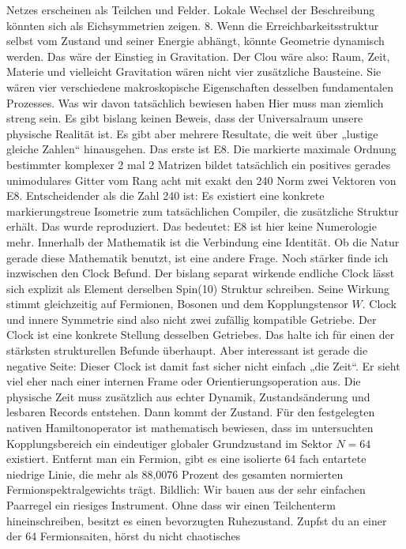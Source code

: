 Netzes erscheinen als Teilchen und Felder. Lokale Wechsel der
Beschreibung könnten sich als Eichsymmetrien zeigen. 8. Wenn die
Erreichbarkeitsstruktur selbst vom Zustand und seiner Energie abhängt,
könnte Geometrie dynamisch werden. Das wäre der Einstieg in Gravitation.
Der Clou wäre also: Raum, Zeit, Materie und vielleicht Gravitation wären
nicht vier zusätzliche Bausteine. Sie wären vier verschiedene
makroskopische Eigenschaften desselben fundamentalen Prozesses. Was wir
davon tatsächlich bewiesen haben Hier muss man ziemlich streng sein. Es
gibt bislang keinen Beweis, dass der Universalraum unsere physische
Realität ist. Es gibt aber mehrere Resultate, die weit über „lustige
gleiche Zahlen`` hinausgehen. Das erste ist E8. Die markierte maximale
Ordnung bestimmter komplexer 2 mal 2 Matrizen bildet tatsächlich ein
positives gerades unimodulares Gitter vom Rang acht mit exakt den 240
Norm zwei Vektoren von E8. Entscheidender als die Zahl 240 ist: Es
existiert eine konkrete markierungstreue Isometrie zum tatsächlichen
Compiler, die zusätzliche Struktur erhält. Das wurde reproduziert. Das
bedeutet: E8 ist hier keine Numerologie mehr. Innerhalb der Mathematik
ist die Verbindung eine Identität. Ob die Natur gerade diese Mathematik
benutzt, ist eine andere Frage. Noch stärker finde ich inzwischen den
Clock Befund. Der bislang separat wirkende endliche Clock lässt sich
explizit als Element derselben Spin(10) Struktur schreiben. Seine
Wirkung stimmt gleichzeitig auf Fermionen, Bosonen und dem
Kopplungstensor \(W\). Clock und innere Symmetrie sind also nicht zwei
zufällig kompatible Getriebe. Der Clock ist eine konkrete Stellung
desselben Getriebes. Das halte ich für einen der stärksten strukturellen
Befunde überhaupt. Aber interessant ist gerade die negative Seite:
Dieser Clock ist damit fast sicher nicht einfach „die Zeit``. Er sieht
viel eher nach einer internen Frame oder Orientierungsoperation aus. Die
physische Zeit muss zusätzlich aus echter Dynamik, Zustandsänderung und
lesbaren Records entstehen. Dann kommt der Zustand. Für den festgelegten
nativen Hamiltonoperator ist mathematisch bewiesen, dass im untersuchten
Kopplungsbereich ein eindeutiger globaler Grundzustand im Sektor
\(N=64\) existiert. Entfernt man ein Fermion, gibt es eine isolierte 64
fach entartete niedrige Linie, die mehr als 88,0076 Prozent des gesamten
normierten Fermionspektralgewichts trägt. Bildlich: Wir bauen aus der
sehr einfachen Paarregel ein riesiges Instrument. Ohne dass wir einen
Teilchenterm hineinschreiben, besitzt es einen bevorzugten Ruhezustand.
Zupfst du an einer der 64 Fermionsaiten, hörst du nicht chaotisches
